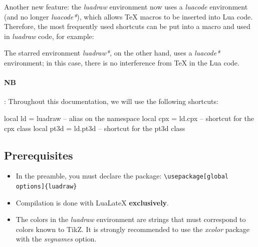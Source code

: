 Another new feature: the \emph{luadraw} environment now uses a \emph{luacode} environment (and no longer \emph{luacode*}), which allows TeX macros to be inserted into Lua code. Therefore, the most frequently used shortcuts can be put into a macro and used in \emph{luadraw} code, for example:


The starred environment \emph{luadraw*}, on the other hand, uses a \emph{luacode*} environment; in this case, there is no interference from \TeX{} in the Lua code.

\paragraph{NB}: Throughout this documentation, we will use the following shortcuts:

\begin{Luacode}
local ld = luadraw -- alias on the namespace
local cpx = ld.cpx -- shortcut for the cpx class
local pt3d = ld.pt3d -- shortcut for the pt3d class
\end{Luacode}


\subsection{Prerequisites}

\begin{itemize}
\item In the preamble, you must declare the \luadrawenv package: \verb|\usepackage[global options]{luadraw}|
\item Compilation is done with LuaLateX \textbf{exclusively}.
\item The colors in the \emph{luadraw} environment are strings that must correspond to colors known to TikZ. It is strongly recommended to use the \emph{xcolor} package with the \emph{svgnames} option.
\end{itemize}

